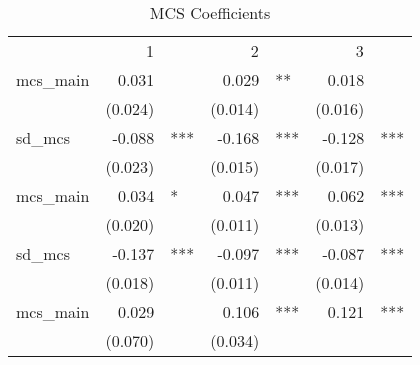 \begin{table}[!h]
\caption{MCS Coefficients}
\centering
\begin{tabular}{lllllll}
\cline{1-7}
\multicolumn{1}{r}{} &
  \multicolumn{2}{c}{1} &
  \multicolumn{2}{c}{2} &
  \multicolumn{2}{c}{3} \\
\cline{1-7}
\multicolumn{1}{l}{mcs\_main} &
  \multicolumn{1}{r}{0.031} &
  \multicolumn{1}{l}{} &
  \multicolumn{1}{r}{0.029} &
  \multicolumn{1}{l}{**} &
  \multicolumn{1}{r}{0.018} &
  \multicolumn{1}{l}{} \\
\multicolumn{1}{l}{} &
  \multicolumn{1}{r}{(0.024)} &
  \multicolumn{1}{l}{} &
  \multicolumn{1}{r}{(0.014)} &
  \multicolumn{1}{l}{} &
  \multicolumn{1}{r}{(0.016)} &
  \multicolumn{1}{l}{} \\
\multicolumn{1}{l}{sd\_mcs} &
  \multicolumn{1}{r}{-0.088} &
  \multicolumn{1}{l}{***} &
  \multicolumn{1}{r}{-0.168} &
  \multicolumn{1}{l}{***} &
  \multicolumn{1}{r}{-0.128} &
  \multicolumn{1}{l}{***} \\
\multicolumn{1}{l}{} &
  \multicolumn{1}{r}{(0.023)} &
  \multicolumn{1}{l}{} &
  \multicolumn{1}{r}{(0.015)} &
  \multicolumn{1}{l}{} &
  \multicolumn{1}{r}{(0.017)} &
  \multicolumn{1}{l}{} \\
\multicolumn{1}{l}{mcs\_main} &
  \multicolumn{1}{r}{0.034} &
  \multicolumn{1}{l}{*} &
  \multicolumn{1}{r}{0.047} &
  \multicolumn{1}{l}{***} &
  \multicolumn{1}{r}{0.062} &
  \multicolumn{1}{l}{***} \\
\multicolumn{1}{l}{} &
  \multicolumn{1}{r}{(0.020)} &
  \multicolumn{1}{l}{} &
  \multicolumn{1}{r}{(0.011)} &
  \multicolumn{1}{l}{} &
  \multicolumn{1}{r}{(0.013)} &
  \multicolumn{1}{l}{} \\
\multicolumn{1}{l}{sd\_mcs} &
  \multicolumn{1}{r}{-0.137} &
  \multicolumn{1}{l}{***} &
  \multicolumn{1}{r}{-0.097} &
  \multicolumn{1}{l}{***} &
  \multicolumn{1}{r}{-0.087} &
  \multicolumn{1}{l}{***} \\
\multicolumn{1}{l}{} &
  \multicolumn{1}{r}{(0.018)} &
  \multicolumn{1}{l}{} &
  \multicolumn{1}{r}{(0.011)} &
  \multicolumn{1}{l}{} &
  \multicolumn{1}{r}{(0.014)} &
  \multicolumn{1}{l}{} \\
\multicolumn{1}{l}{mcs\_main} &
  \multicolumn{1}{r}{0.029} &
  \multicolumn{1}{l}{} &
  \multicolumn{1}{r}{0.106} &
  \multicolumn{1}{l}{***} &
  \multicolumn{1}{r}{0.121} &
  \multicolumn{1}{l}{***} \\
\multicolumn{1}{l}{} &
  \multicolumn{1}{r}{(0.070)} &
  \multicolumn{1}{l}{} &
  \multicolumn{1}{r}{(0.034)} &

\end{tabular}
\end{table}
